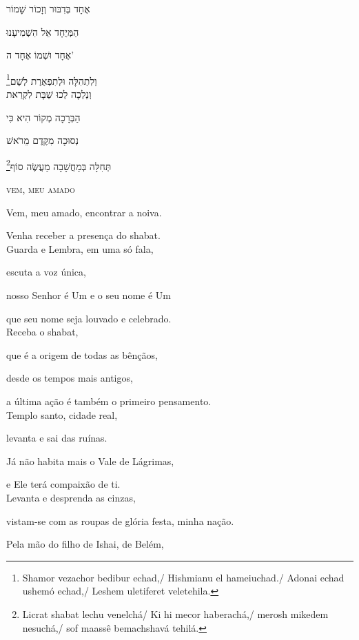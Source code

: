 אֶחָד בְּדִבּוּר וְזָכוֹר שָׁמוֹר

הַמְּיֻחָד אֵל הִשְׁמִיעָנוּ

אֶחָד וּשְׁמוֹ אֶחָד ה' 

\footnote{Shamor vezachor bedibur echad,/ Hishmianu el hameiuchad./ Adonai echad ushemó echad,/ Leshem uletiferet veletehila.}וְלִתְהִלָּה וּלְתִפְאֶרֶת לְשֵׁם\\[10pt]

וְנֵלְכָה לְכוּ שַׁבָּת לִקְרַאת

הַבְּרָכָה מְקוֹר הִיא כִּי

נְסוּכָה מִקֶּדֶם מֵרֹאשׁ 

\footnote{Licrat shabat lechu venelchá/ Ki hi mecor haberachá,/ merosh mikedem nesuchá,/ sof maassê bemachshavá tehilá.}תְּחִלָּה בְּמַחֲשָׁבָה מַעֲשֶּׂה סוֹף\\[10pt]

\movetooddpage
\raggedright

\textsc{vem, meu amado}\\[15pt]

\label{casamento}

Vem, meu amado, encontrar a noiva.

Venha receber a presença do shabat.\\[10pt]

Guarda e Lembra, em uma só fala,

escuta a voz única,

nosso Senhor é Um e o seu nome é Um

que seu nome seja louvado e celebrado.\\[10pt]

Receba o shabat,

que é a origem de todas as bênçãos,

desde os tempos mais antigos,

a última ação é também o primeiro pensamento.\\[10pt]

Templo santo, cidade real,

levanta e sai das ruínas.

Já não habita mais o Vale de Lágrimas,

e Ele terá compaixão de ti.\\[10pt]

Levanta e desprenda as cinzas,

vistam-se com as roupas de glória festa, minha nação.

Pela mão do filho de Ishai, de Belém,

